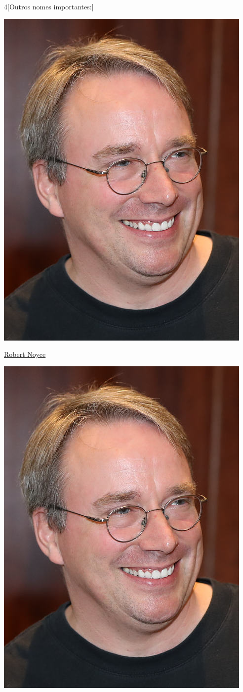 \begin{multicols}{4}[Outros nomes importantes:]
\begin{center}
					\includegraphics[width=.8\columnwidth]{./IMG-GIT/CIENTISTAS/linus.jpeg}
\end{center}
				
\vfill\null
\columnbreak				
				
				\href{https://pt.wikipedia.org/wiki/Robert_Noyce}{Robert Noyce}
				
\begin{center}
					\includegraphics[width=.8\columnwidth]{./IMG-GIT/CIENTISTAS/linus.jpeg}
\end{center}
				

\end{multicols}
